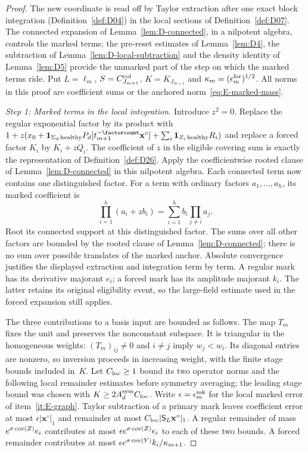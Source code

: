 \begin{proof}
The new coordinate is read off by Taylor extraction after one exact block integration (Definition~\ref{def:D04}) in the local sections of Definition~\ref{def:D07}. The connected expansion of Lemma~\ref{lem:D-connected}, in a nilpotent algebra, controls the marked terms; the pre-reset estimates of Lemma~\ref{lem:D4}, the subtraction of Lemma~\ref{lem:D-local-subtraction} and the density identity of Lemma~\ref{lem:D5} provide the unmarked part of the step on which the marked terms ride. Put $L=\ell_m$, $S=C^{\rm col}_{J_{m+1}}$, $K=K_{J_{m+1}}$ and $\kappa_m=(\epsilon_m^{\rm for})^{1/2}$. All norms in this proof are coefficient sums or the anchored norm~\eqref{eq:E-marked-mass}.

\emph{Step 1: Marked terms in the local integration.}
Introduce $z^2=0$. Replace the regular exponential factor by its product with
$1+z(x_0+\mathbf1_{\Sigma_d\,\mathrm{healthy}}P_d[t_{m+1}^{-\factorcount}\mathbf x^\circ]+\sum_i\mathbf1_{Z_i\,\mathrm{healthy}}R_i)$ and replace a forced factor $K_i$ by $K_i+zQ_i$. The coefficient of $z$ in the eligible covering sum is exactly the representation of Definition~\ref{def:D26}. Apply the coefficientwise rooted clause of Lemma~\ref{lem:D-connected} in this nilpotent algebra. Each connected term now contains one distinguished factor. For a term with ordinary factors $a_1,\ldots,a_h$, its marked coefficient is
\begin{equation*}
 [z]\prod_{i=1}^h(a_i+zb_i)
 =\sum_{i=1}^h b_i\prod_{j\ne i}a_j.
\end{equation*}
Root its connected support at this distinguished factor. The sums over all other factors are bounded by the rooted clause of Lemma~\ref{lem:D-connected}; there is no sum over possible translates of the marked anchor. Absolute convergence justifies the displayed extraction and integration term by term. A regular mark has its derivative majorant $e_i$; a forced mark has its amplitude majorant $k_i$. The latter retains its original eligibility event, so the large-field estimate used in the forced expansion still applies.

The three contributions to a basis input are bounded as follows. The map $T_m$ fixes the unit and preserves the nonconstant subspace. It is triangular in the homogeneous weights: $(T_m)_{ij}\ne0$ and $i\ne j$ imply $w_j<w_i$. Its diagonal entries are nonzero, so inversion proceeds in increasing weight, with the finite stage bounds included in~$K$. Let $C_{\rm loc}\ge1$ bound its two operator norms and the following local remainder estimates before symmetry averaging; the leading stage bound was chosen with $K\ge2A_d^{\rm sym}C_{\rm loc}$. Write $\epsilon=\epsilon^{\rm mk}_m$ for the local marked error of item~\ref{it:E-graph}. Taylor subtraction of a primary mark leaves coefficient error at most $\epsilon|\mathbf x^\circ|_1$ and remainder at most $C_{\rm loc}|\mathsf S_L\mathbf x^\circ|_1$. A regular remainder of mass $e^{\sigma\operatorname{cov}(Z)}e_i$ contributes at most $\epsilon e^{\sigma\operatorname{cov}(Z)}e_i$ to each of these two bounds. A forced remainder contributes at most $\epsilon e^{\sigma\operatorname{cov}(Y)}k_i/\kappa_{m+1}$.


\end{proof}
